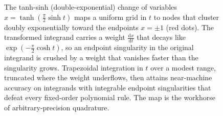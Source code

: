 \begin{figure}[htbp]
\centering
{}
\caption[The tanh-sinh node map]{The tanh-sinh (double-exponential)
change of variables $x = \tanh(\frac{\pi}{2}\sinh t)$ maps a uniform
grid in $t$ to nodes that cluster doubly exponentially toward the
endpoints $x = \pm 1$ (red dots). The transformed integrand carries a
weight $\frac{\mathrm{d}x}{\mathrm{d}t}$ that decays like
$\exp(-\frac{\pi}{2}\cosh t)$, so an endpoint singularity in the
original integrand is crushed by a weight that vanishes faster than the
singularity grows. Trapezoidal integration in $t$ over a modest range,
truncated where the weight underflows, then attains near-machine
accuracy on integrands with integrable endpoint singularities that
defeat every fixed-order polynomial rule. The map is the workhorse of
arbitrary-precision quadrature.}
\label{fig:vol02:ch06:tanh-sinh}
\end{figure}
